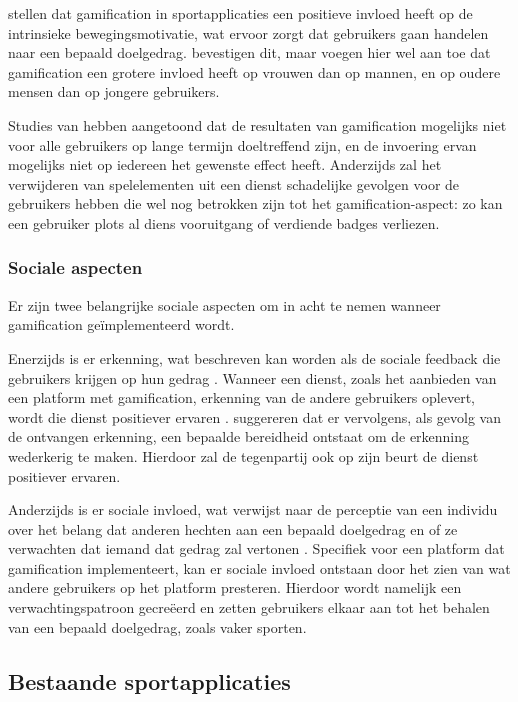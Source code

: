 \textcite{Kari2016} stellen dat gamification in sportapplicaties een positieve invloed heeft op de intrinsieke bewegingsmotivatie, wat ervoor zorgt dat gebruikers gaan handelen naar een bepaald doelgedrag. \textcite{PoloPena2020} bevestigen dit, maar voegen hier wel aan toe dat gamification een grotere invloed heeft op vrouwen dan op mannen, en op oudere mensen dan op jongere gebruikers.

Studies van \textcite{Hamari2013a} hebben aangetoond dat de resultaten van gamification mogelijks niet voor alle gebruikers op lange termijn doeltreffend zijn, en de invoering ervan mogelijks niet op iedereen het gewenste effect heeft.
Anderzijds zal het verwijderen van spelelementen uit een dienst schadelijke gevolgen voor de gebruikers hebben die wel nog betrokken zijn tot het gamification-aspect: zo kan een gebruiker plots al diens vooruitgang of verdiende badges verliezen.

\subsubsection{Sociale aspecten}

Er zijn twee belangrijke sociale aspecten om in acht te nemen wanneer gamification geïmplementeerd wordt.

Enerzijds is er erkenning, wat beschreven kan worden als de sociale feedback die gebruikers krijgen op hun gedrag \autocite{Cheung2011}.
Wanneer een dienst, zoals het aanbieden van een platform met gamification, erkenning van de andere gebruikers oplevert, wordt die dienst positiever ervaren \autocite{Preece2001}.
\textcite{Hamari2013} suggereren dat er vervolgens, als gevolg van de ontvangen erkenning, een bepaalde bereidheid ontstaat om de erkenning wederkerig te maken. Hierdoor zal de tegenpartij ook op zijn beurt de dienst positiever ervaren.

Anderzijds is er sociale invloed, wat verwijst naar de perceptie van een individu over het belang dat anderen hechten aan een bepaald doelgedrag en of ze verwachten dat iemand dat gedrag zal vertonen \autocite{Ajzen1991}. Specifiek voor een platform dat gamification implementeert, kan er sociale invloed ontstaan door het zien van wat andere gebruikers op het platform presteren. Hierdoor wordt namelijk een verwachtingspatroon gecreëerd en zetten gebruikers elkaar aan tot het behalen van een bepaald doelgedrag, zoals vaker sporten.

\subsection{Bestaande sportapplicaties}


